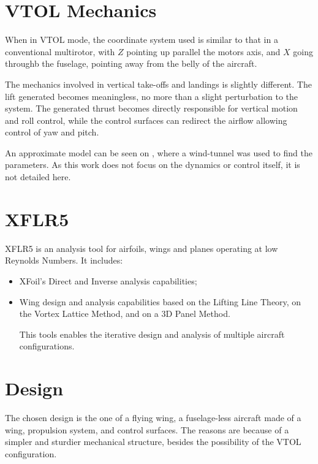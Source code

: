 \section{VTOL Mechanics}

When in VTOL mode, the coordinate system used is similar to that in a conventional multirotor, with $Z$ pointing up parallel the motors axis, and $X$ going throughb the fuselage, pointing away from the belly of the aircraft.

The mechanics involved in vertical take-offs and landings is slightly different. The lift generated becomes meaningless, no more than a slight perturbation to the system. The generated thrust becomes directly responsible for vertical motion and roll control, while the control surfaces can redirect the airflow allowing control of yaw and pitch.

An approximate model can be seen on \cite{7487466}, where a wind-tunnel was used to find the parameters. As this work does not focus on the dynamics or control itself, it is not detailed here.


\section{XFLR5}

XFLR5 is an analysis tool for airfoils, wings and planes operating at low Reynolds Numbers. It includes:
\begin{itemize}

\item XFoil's Direct and Inverse analysis capabilities;
\item Wing design and analysis capabilities based on the Lifting Line Theory, on the Vortex Lattice Method, and on a 3D Panel Method.

This tools enables the iterative design and analysis of multiple aircraft configurations.


\end{itemize}


\section{Design}

The chosen design is the one of a flying wing, a fuselage-less aircraft made of a wing, propulsion system, and control surfaces. The reasons are because of a simpler and sturdier mechanical structure, besides the possibility of the VTOL configuration.

